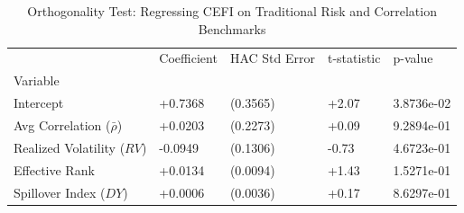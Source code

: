 \begin{table}
\caption{Orthogonality Test: Regressing CEFI on Traditional Risk and Correlation Benchmarks}
\label{tab:orthogonality}
\begin{tabular}{lllll}
\toprule
 & Coefficient & HAC Std Error & t-statistic & p-value \\
Variable &  &  &  &  \\
\midrule
Intercept & +0.7368 & (0.3565) & +2.07 & 3.8736e-02 \\
Avg Correlation ($\bar{\rho}$) & +0.0203 & (0.2273) & +0.09 & 9.2894e-01 \\
Realized Volatility ($RV$) & -0.0949 & (0.1306) & -0.73 & 4.6723e-01 \\
Effective Rank & +0.0134 & (0.0094) & +1.43 & 1.5271e-01 \\
Spillover Index ($DY$) & +0.0006 & (0.0036) & +0.17 & 8.6297e-01 \\
\bottomrule
\end{tabular}
\end{table}
